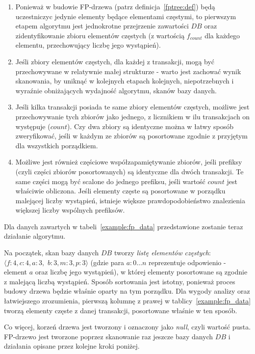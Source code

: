 \begin{enumerate}
	\item Ponieważ w budowie FP-drzewa (patrz definicja~\ref{fptree:def}) będą uczestniczyc jedynie elementy będące elementami częstymi, to pierwszym etapem algorytmu jest jednokrotne przejrzenie zawartości $DB$ oraz zidentyfikowanie zbioru elementów częstych (z wartością $f_{count}$ dla każdego elementu, przechowujący liczbę jego wystąpień).
	\item Jeśli zbiory elementów częstych, dla każdej z transakcji, mogą być przechowywane w relatywnie małej strukturze - warto jest zachować wynik skanowania, by uniknąć w kolejnych etapach kolejnych, niepotrzebnych i wyraźnie obniżających wydajność algorytmu, skanów bazy danych.
	\item Jeśli kilka transakcji posiada te same zbiory elementów częstych, możliwe jest przechowywanie tych zbiorów jako jednego, z licznikiem w ilu transakcjach on występuje ($count$). Czy dwa zbiory są identyczne można w łatwy sposób zweryfikować, jeśli w każdym ze zbiorów są posortowane zgodnie z przyjętym dla wszystkich porządkiem.
	\item Możliwe jest również częściowe współzapamiętywanie zbiorów, jeśli prefiksy (czyli części zbiorów posortowanych) są identyczne dla dwóch transakcji. Te same części mogą być scalone do jednego prefiksu, jeśli wartość $count$ jest właściwie obliczona. Jeśli elementy częste są posortowane w porządku malejącej liczby wystąpień, istnieje większe prawdopodobieństwo znalezienia większej liczby wspólnych prefiksów.
\end{enumerate}

Dla danych zawartych w tabeli~\ref{example:fp_data} przedstawione zostanie teraz działanie algorytmu.

Na początek, skan bazy danych $DB$ tworzy \emph{listę elementów częstych}: $\langle f: 4, c: 4, a: 3,$ $ b: 3, m: 3, p: 3\rangle$ (gdzie para $a:0\dots n$ reprezentuje odpowienio - element $a$ oraz liczbę jego wystąpień), w której elementy posortowane są zgodnie z malejącą liczbą wystąpień. Sposób sortowania jest istotny, ponieważ proces budowy drzewa będzie właśnie oparty na tym porządku. Dla wygody analizy oraz łatwiejszego zrozumienia, pierwszą kolumnę z prawej w tablicy~\ref{example:fp_data} tworzą elementy częste z danej transakcji, posortowane właśnie w ten sposób.

Co więcej, korzeń drzewa jest tworzony i oznaczony jako \emph{null}, czyli wartość pusta. FP-drzewo jest tworzone poprzez skanowanie raz jeszcze bazy danych $DB$ i działania opisane przez kolejne kroki poniżej.

